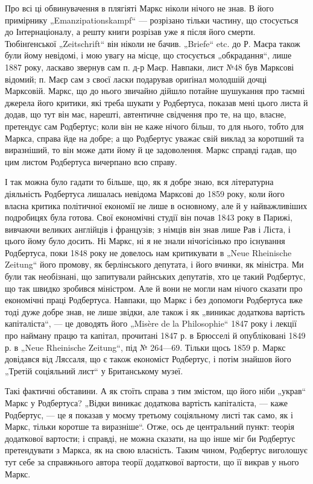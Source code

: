 Про всі ці обвинувачення в плягіяті Маркс ніколи нічого не знав.
В його примірнику „Emanzipationskampf“ — розрізано тільки частину,
що стосується до Інтернаціоналу, а решту книги розрізав уже я після
його смерти. Тюбінґенської „Zeitschrift“ він ніколи не бачив. „Briefe“ etc.
до Р. Маєра також були йому невідомі, і мою увагу на місце, що стосується
„обкрадання“, лише 1887 року, ласкаво звернув сам п. д-р Маєр.
Навпаки, лист №48 був Марксові відомий; п. Маєр сам з своєї ласки
подарував ориґінал молодшій дочці Марксовій. Маркс, що до нього звичайно
дійшло потайне шушукання про таємні джерела його критики, які
треба шукати у Родбертуса, показав мені цього листа й додав, що тут
він має, нарешті, автентичне свідчення про те, на що, власне, претендує
сам Родбертус; коли він не каже нічого більш, то для нього, тобто для
Маркса, справа йде на добре; а що Родбертус уважає свій виклад за
коротший та виразніший, то він може дати йому й це задоволення.
Маркс справді гадав, що цим листом Родбертуса вичерпано всю справу.

І так можна було гадати то більше, що, як я добре знаю, вся літературна
діяльність Родбертуса лишалась невідома Марксові до 1859 року,
коли його власна критика політичної економії не лише в основному, але
й у найважливіших подробицях була готова. Свої економічні студії він
почав 1843 року в Парижі, вивчаючи великих англійців і французів; з
німців він знав лише Рав і Ліста, і цього йому було досить. Ні Маркс,
ні я не знали нічогісінько про існування Родбертуса, поки 1848 року
не довелось нам критикувати в „Neue Rheinische Zeitung“ його промову,
як берлінського депутата, і його вчинки, як міністра. Ми були так необізнані,
що запитували райнських депутатів, хто це такий Родбертус,
що так швидко зробився міністром. Але й вони не могли нам нічого
сказати про економічні праці Родбертуса. Навпаки, що Маркс і без допомоги
Родбертуса вже тоді дуже добре знав, не лише звідки, але також
і як „виникає додаткова вартість капіталіста“, — це доводять його
„Misère de la Philosophie“ 1847 року і лекції про найману працю та капітал,
прочитані 1847 р. в Брюсселі й опубліковані 1849 р. в „Neue
Rheinische Zeitung“, під № 264—69. Тільки щось 1859 р. Маркс довідався
від Ляссаля, що є також економіст Родбертус, і потім знайшов
його „Третій соціяльний лист“ у Британському музеї.

Такі фактичні обставини. А як стоїть справа з тим змістом, що його
ніби „украв“ Маркс у Родбертуса? „Відки виникає додаткова вартість
капіталіста, — каже Родбертус, — це я показав у моєму третьому соціяльному
листі так само, як і Маркс, тільки коротше та виразніше“. Отже,
ось де центральний пункт: теорія додаткової вартости; і справді, не
можна сказати, на що інше міг би Родбертус претендувати з Маркса,
як на свою власність. Таким чином, Родбертус виголошує тут себе за
справжнього автора теорії додаткової вартости, що її викрав у нього Маркс.

